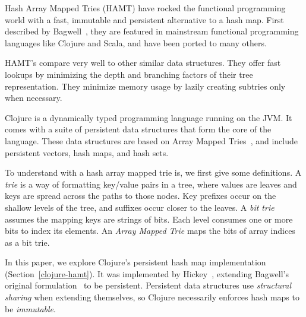 \documentclass[preprint]{sigplanconf}
\begin{document}
Hash Array Mapped Tries (HAMT) have rocked the functional programming
world with a fast, immutable and persistent alternative
to a hash map.
First described by Bagwell~\cite{bagwell2001ideal},
they are featured in mainstream functional programming
languages like Clojure and Scala, and have been ported
to many others.




HAMT's compare very well to other similar data structures.
They offer fast lookups by minimizing the depth and
branching factors of their tree representation.
They minimize memory usage by lazily creating subtries
only when necessary. 

Clojure is a dynamically typed programming language
running on the JVM.
It comes with a suite of persistent data structures
that form the core of the language.
These data structures are based on Array Mapped Tries~\cite{bagwell2000fast},
and include persistent vectors, hash maps, and hash sets.

To understand with a hash array mapped trie is, 
we first give some definitions.
A \textit{trie} is a way of formatting key/value pairs
in a tree, where values are leaves and keys are spread
across the paths to those nodes.
Key prefixes occur on the shallow levels of the tree,
and suffixes occur closer to the leaves.
A \textit{bit trie} assumes the mapping keys are strings
of bits. Each level consumes one or more bits to index
its elements.
An \textit{Array Mapped Trie}
maps the bits of array indices as a bit trie.

In this paper, we explore Clojure's persistent hash
map implementation
(Section~\ref{clojure-hamt}).
It was implemented by Hickey~\cite{hickey2008clojure}, extending
Bagwell's original formulation~\cite{bagwell2001ideal}
to be persistent.
Persistent data structures use \textit{structural sharing}
when extending themselves, so Clojure necessarily enforces
hash maps to be \textit{immutable}.

\end{document}
